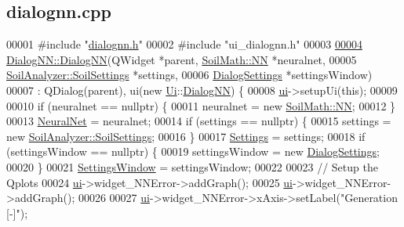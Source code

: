 \hypertarget{dialognn_8cpp_source}{}\subsection{dialognn.\+cpp}
\label{dialognn_8cpp_source}

\begin{DoxyCode}
00001 \textcolor{preprocessor}{#include "\hyperlink{dialognn_8h}{dialognn.h}"}
00002 \textcolor{preprocessor}{#include "ui\_dialognn.h"}
00003 
\hypertarget{dialognn_8cpp_source_l00004}{}\hyperlink{class_dialog_n_n_a53065cfe16eeaf3cf1b1e94058738c3f}{00004} \hyperlink{class_dialog_n_n_a53065cfe16eeaf3cf1b1e94058738c3f}{DialogNN::DialogNN}(QWidget *parent, \hyperlink{class_soil_math_1_1_n_n}{SoilMath::NN} *neuralnet,
00005                    \hyperlink{class_soil_analyzer_1_1_soil_settings}{SoilAnalyzer::SoilSettings} *settings,
00006                    \hyperlink{class_dialog_settings}{DialogSettings} *settingsWindow)
00007     : QDialog(parent), ui(new \hyperlink{namespace_ui}{Ui}::\hyperlink{class_dialog_n_n}{DialogNN}) \{
00008   \hyperlink{class_dialog_n_n_affd6ce2909be5826c52fd862d1963eee}{ui}->setupUi(\textcolor{keyword}{this});
00009 
00010   \textcolor{keywordflow}{if} (neuralnet == \textcolor{keyword}{nullptr}) \{
00011     neuralnet = \textcolor{keyword}{new} \hyperlink{class_soil_math_1_1_n_n}{SoilMath::NN};
00012   \}
00013   \hyperlink{class_dialog_n_n_a1d38f96a8f11697068e805fdaa3267b2}{NeuralNet} = neuralnet;
00014   \textcolor{keywordflow}{if} (settings == \textcolor{keyword}{nullptr}) \{
00015     settings = \textcolor{keyword}{new} \hyperlink{class_soil_analyzer_1_1_soil_settings}{SoilAnalyzer::SoilSettings};
00016   \}
00017   \hyperlink{class_dialog_n_n_afdf8c81b845ec58a3f495c2dd3423377}{Settings} = settings;
00018   \textcolor{keywordflow}{if} (settingsWindow == \textcolor{keyword}{nullptr}) \{
00019     settingsWindow = \textcolor{keyword}{new} \hyperlink{class_dialog_settings}{DialogSettings};
00020   \}
00021   \hyperlink{class_dialog_n_n_aeaad085b1b2c7e4613228aa612d725f4}{SettingsWindow} = settingsWindow;
00022 
00023   \textcolor{comment}{// Setup the Qplots}
00024   \hyperlink{class_dialog_n_n_affd6ce2909be5826c52fd862d1963eee}{ui}->widget\_NNError->addGraph();
00025   \hyperlink{class_dialog_n_n_affd6ce2909be5826c52fd862d1963eee}{ui}->widget\_NNError->addGraph();
00026 
00027   \hyperlink{class_dialog_n_n_affd6ce2909be5826c52fd862d1963eee}{ui}->widget\_NNError->xAxis->setLabel(\textcolor{stringliteral}{"Generation [-]"});

\end{DoxyCode}
